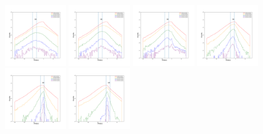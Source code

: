 \documentclass[12pt,prd]{article}
\begin{document}
\begin{figure}[h!]
\includegraphics[width=0.24\textwidth]{../figures/scanning_plotsgaiascan_l99_0_b50_2_ra224_7_dec60_6_npy_6.pdf}
\includegraphics[width=0.24\textwidth]{../figures/scanning_plotsgaiascan_l99_0_b50_2_ra224_7_dec60_6_npy_7.pdf}
\includegraphics[width=0.24\textwidth]{../figures/scanning_plotsgaiascan_l99_0_b50_2_ra224_7_dec60_6_npy_8.pdf}
\includegraphics[width=0.24\textwidth]{../figures/scanning_plotsgaiascan_l99_0_b50_2_ra224_7_dec60_6_npy_9.pdf}
\includegraphics[width=0.24\textwidth]{../figures/scanning_plotsgaiascan_l99_0_b50_2_ra224_7_dec60_6_npy_10.pdf}
\includegraphics[width=0.24\textwidth]{../figures/scanning_plotsgaiascan_l99_0_b50_2_ra224_7_dec60_6_npy_11.pdf}

\end{figure}
\end{document}
